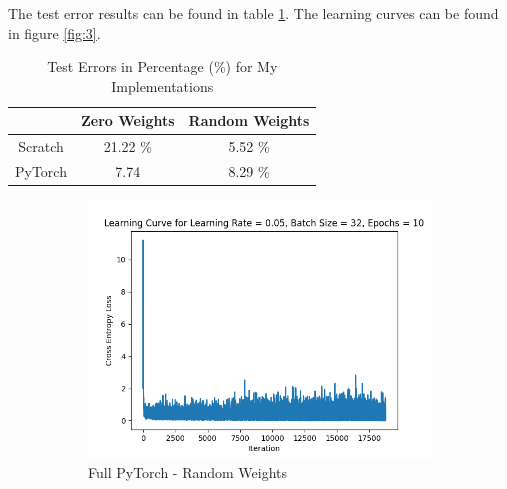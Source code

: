 \documentclass[a4paper]{article}
\theoremstyle{definition}
\newenvironment{soln}{
    \leavevmode\color{blue}\ignorespaces
}{}
\begin{document}
\begin{enumerate}
    \begin{soln}
        The test error results can be found in table \ref{tab:6}. The learning curves can be found in figure \ref{fig:3}.
        \begin{table}[H]
            \centering
            \begin{tabular}{|c|c|c|}
                \hline
                 & Zero Weights & Random Weights \\
                \hline
                Scratch & 21.22 \% & 5.52 \% \\
                \hline
                PyTorch & 7.74 & 8.29 \% \\
                \hline
            \end{tabular}
            \caption{Test Errors in Percentage (\%) for My Implementations}
            \label{tab:6}
        \end{table}
        \begin{figure}[H]
            \centering
            \begin{subfigure}{0.5\textwidth}
              \centering
              \includegraphics[width=1.1\linewidth]{MNIST_Learning_Curve_Torch_Random.png}
              \caption{Full PyTorch - Random Weights}
              \label{fig:3sub1}
            \end{subfigure}%
            \begin{subfigure}{0.5\textwidth}
              \centering

\end{subfigure}
\end{figure}
\end{soln}
\end{enumerate}
\end{document}
